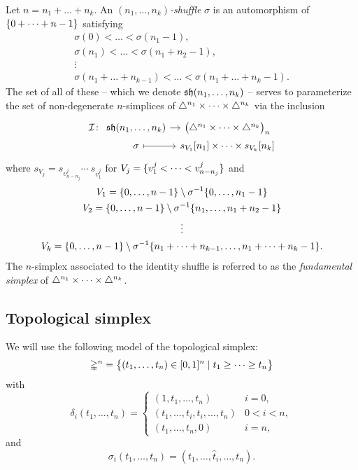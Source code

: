 Let $n = n_1 + \dots + n_k$.
An \textit{$(n_1, \dots, n_k)$-shuffle} $\sigma$ is an automorphism of $\{0 + \dots + n-1\}$ satisfying
\begin{gather*}
	\sigma(0) < \dots < \sigma(n_1-1), \\
	\sigma(n_1) < \dots < \sigma(n_1+n_2-1), \\
	\vdots \\
	\sigma(n_1+\dots+n_{k-1}) < \dots < \sigma(n_1+\dots+n_k-1).
\end{gather*}
The set of all of these -- which we denote $\operatorname{\mathfrak{sh}}(n_1, \dots, n_k)$ -- serves to parameterize the set of non-degenerate $n$-simplices of $\triangle^{n_1} \times \dots \times \triangle^{n_k}$ via the inclusion
\[
\begin{tikzcd}[column sep=tiny, row sep=0]
	\cI \colon &[-10pt]
	\sh(n_1, \dots, n_k) \arrow[r] &
	\big(\simplex^{n_1} \times \dots \times \simplex^{n_k}\big)_n \\ &
	\sigma \arrow[r, mapsto] &
	s_{V_1} [n_1] \times \dots \times s_{V_k} [n_k]
\end{tikzcd}
\]
where $s_{V_j} = s_{v_{n-n_j}^j} \dotsb \ s_{v_1^j}$ for $V_j = \{v_1^j < \dots < v_{n-n_j}^j\}$ and
\begin{gather*}
	V_1 = \{0,\dots,n-1\} \setminus \sigma^{-1} \{0,\dots,n_1-1\} \\
	V_2 = \{0,\dots,n-1\} \setminus \sigma^{-1} \{n_1, \dots, n_1+n_2-1\} \\
	\vdots \\
	V_k = \{0,\dots,n-1\} \setminus \sigma^{-1} \{n_1+\dots+n_{k-1}, \dots, n_1+\dots+n_k-1\}.
\end{gather*}
The $n$-simplex associated to the identity shuffle is referred to as the \textit{fundamental simplex} of $\triangle^{n_1} \times \dots \times \triangle^{n_k}$.

\subsection{Topological simplex}

We will use the following model of the topological simplex:
\[
\mathbb{\Delta}^n = \big\{
(t_1, \dots, t_n) \in [0,1]^n \mid t_1 \geq \dots \geq t_n
\big\}
\]
with
\[
\delta_i(t_1, \dots, t_n) =
\begin{cases}
	(1, t_1, \dots, t_n) & i = 0, \\
	(t_1, \dots, t_i, t_i, \dots, t_n) & 0 < i < n, \\
	(t_1, \dots, t_n, 0) & i = n,
\end{cases}
\]
and
\[
\sigma_i(t_1, \dots, t_n) = (t_1, \dots, \widehat t_i, \dots, t_n).
\]


